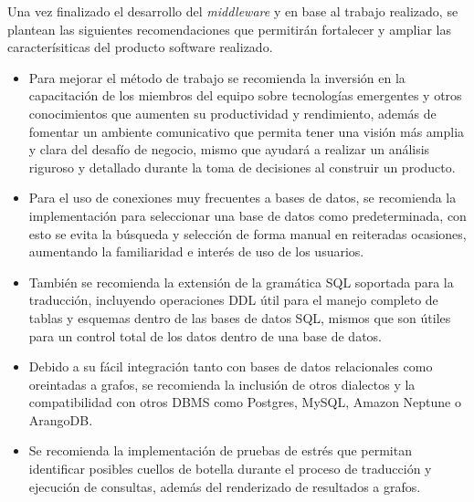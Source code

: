 Una vez finalizado el desarrollo del \textit{middleware} y en base al trabajo realizado, se plantean las siguientes recomendaciones que permitirán fortalecer y ampliar las caracterísiticas del producto software realizado. 

\begin{itemize}
    \item Para mejorar el método de trabajo se recomienda la inversión en la capacitación de los miembros del equipo sobre tecnologías emergentes y otros conocimientos que aumenten su productividad y rendimiento, además de fomentar un ambiente comunicativo que permita tener una visión más amplia y clara del desafío de negocio, mismo que ayudará a realizar un análisis riguroso y detallado durante la toma de decisiones al construir un producto.
    \item Para el uso de conexiones muy frecuentes a bases de datos, se recomienda la  implementación para seleccionar una base de datos como predeterminada, con esto se evita la búsqueda y selección de forma manual en reiteradas ocasiones, aumentando la familiaridad e interés de uso de los usuarios.
    \item También se recomienda la extensión de la gramática SQL soportada para la traducción, incluyendo operaciones DDL útil para el manejo completo de tablas y esquemas dentro de las bases de datos SQL, mismos que son útiles para un control total de los datos dentro de una base de datos.
    \item Debido a su fácil integración tanto con bases de datos relacionales como oreintadas a grafos, se recomienda la inclusión de otros dialectos y la compatibilidad con otros DBMS como Postgres, MySQL, Amazon Neptune o ArangoDB.
    \item Se recomienda la implementación de pruebas de estrés que permitan identificar posibles cuellos de botella durante el proceso de traducción y ejecución de consultas, además del renderizado de resultados a grafos.
\end{itemize}